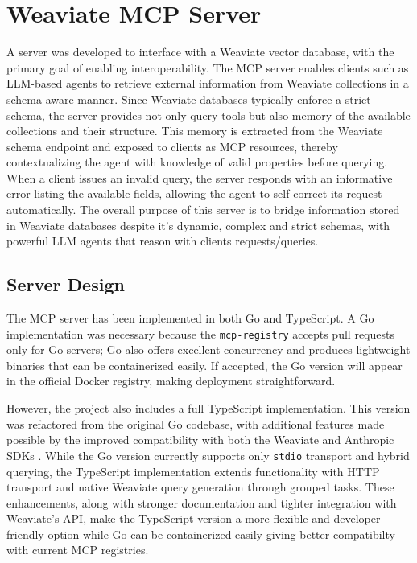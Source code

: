 \section{Weaviate MCP Server}
\label{sec:weaviate-mcp-server}
A  server was developed to interface with a Weaviate vector database, with the primary goal of enabling interoperability. The MCP server enables clients such as \gls{LLM}-based agents to retrieve external information from Weaviate collections in a schema-aware manner. Since Weaviate databases typically enforce a strict schema, the server provides not only query tools but also memory of the available collections and their structure. This memory is extracted from the Weaviate schema endpoint and exposed to clients as MCP resources, thereby contextualizing the agent with knowledge of valid properties before querying. When a client issues an invalid query, the server responds with an informative error listing the available fields, allowing the agent to self-correct its request automatically. The overall purpose of this server is to bridge information stored in Weaviate databases despite it's dynamic, complex and strict schemas, with powerful \gls{LLM} agents that reason with clients requests/queries.

\subsection{Server Design}

The MCP server has been implemented in both Go and TypeScript. A Go implementation was necessary because the \texttt{mcp-registry} accepts pull requests only for Go servers; Go also offers excellent concurrency and produces lightweight binaries that can be containerized easily. If accepted, the Go version will appear in the official Docker registry, making deployment straightforward.

However, the project also includes a full TypeScript implementation. This version was refactored from the original Go codebase, with additional features made possible by the improved compatibility with both the Weaviate and Anthropic SDKs \cite{stainless_mcp_comparison}. While the Go version currently supports only \texttt{stdio} transport and hybrid querying, the TypeScript implementation extends functionality with HTTP transport and native Weaviate query generation through grouped tasks. These enhancements, along with stronger documentation and tighter integration with Weaviate’s API, make the TypeScript version a more flexible and developer-friendly option while Go can be containerized easily giving better compatibilty with current \gls{MCP} registries.
